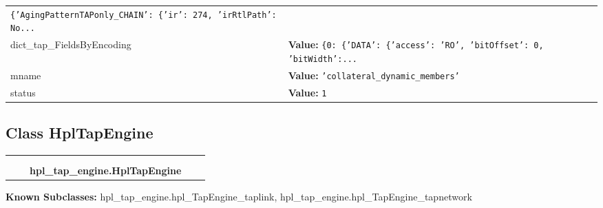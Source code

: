 \begin{longtable}{|p{\varnamewidth}|p{\vardescrwidth}|l}
{\tt \texttt{\{}\texttt{'}\texttt{AgingPatternTAPonly\_CHAIN}\texttt{'}\texttt{: }\texttt{\{}\texttt{'}\texttt{ir}\texttt{'}\texttt{: }274\texttt{, }\texttt{'}\texttt{irRtlPath}\texttt{'}\texttt{: }No\texttt{...}}&\\
\cline{1-2}
\raggedright d\-i\-c\-t\-\_\-t\-a\-p\-\_\-F\-i\-e\-l\-d\-s\-B\-y\-E\-n\-c\-o\-d\-i\-n\-g\- & \raggedright \textbf{Value:} 
{\tt \texttt{\{}0\texttt{: }\texttt{\{}\texttt{'}\texttt{DATA}\texttt{'}\texttt{: }\texttt{\{}\texttt{'}\texttt{access}\texttt{'}\texttt{: }\texttt{'}\texttt{RO}\texttt{'}\texttt{, }\texttt{'}\texttt{bitOffset}\texttt{'}\texttt{: }0\texttt{, }\texttt{'}\texttt{bitWidth}\texttt{'}\texttt{:}\texttt{...}}&\\
\cline{1-2}
\raggedright m\-n\-a\-m\-e\- & \raggedright \textbf{Value:} 
{\tt \texttt{'}\texttt{collateral\_dynamic\_members}\texttt{'}}&\\
\cline{1-2}
\raggedright s\-t\-a\-t\-u\-s\- & \raggedright \textbf{Value:} 
{\tt 1}&\\
\cline{1-2}
\end{longtable}



\subsection{Class HplTapEngine}

    \label{hpl_tap_engine:HplTapEngine}
\begin{tabular}{cccccc}
\multicolumn{2}{r}{\settowidth{\BCL}{object}\multirow{2}{\BCL}{object}}
&&
  \\\cline{3-3}
  &&\multicolumn{1}{c|}{}
&&
  \\
&&\multicolumn{2}{l}{\textbf{hpl\_tap\_engine.HplTapEngine}}
\end{tabular}

\textbf{Known Subclasses:}
hpl\_tap\_engine.hpl\_TapEngine\_taplink,
    hpl\_tap\_engine.hpl\_TapEngine\_tapnetwork



